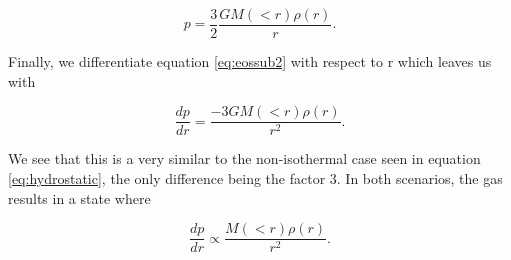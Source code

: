 \documentclass[a4paper]{article}
\begin{document}
\begin{equation}\label{eq:eossub2}
    p = \frac{3}{2} \frac{G M (<r) \rho (r)}{r}.
\end{equation}

\noindent Finally, we differentiate equation \eqref{eq:eossub2} with respect to r which 
leaves us with 

\begin{equation}\label{eq:isohydro}
    \frac{dp}{dr} = \frac{-3GM(<r) \rho(r)}{r^2}.
\end{equation}

\noindent We see that this is a very similar to the non-isothermal case seen in equation \eqref{eq:hydrostatic}, the only difference being the factor 3. In both scenarios, the gas results in a state where

\begin{equation}\label{eq:hydroprop}
    \frac{dp}{dr} \propto \frac{M(<r)\rho(r)}{r^2}.
\end{equation}
\end{document}
